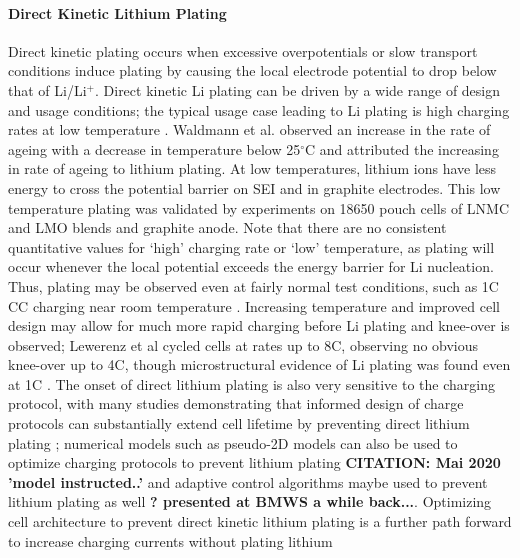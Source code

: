 \documentclass[journal=jpcl, manuscript=article, layout=onecolumn]{achemso}
\begin{document}
\paragraph{Direct Kinetic Lithium Plating}
Direct kinetic plating occurs when excessive overpotentials or slow transport conditions induce plating by causing the local electrode potential to drop below that of Li/Li$\mathrm{^+}$. Direct kinetic Li plating can be driven by a wide range of design and usage conditions; the typical usage case leading to Li plating is high charging rates at low temperature \cite{waldmann_temperature_2014, petzl_lithium_2015}. Waldmann et al.\cite{waldmann_temperature_2014} observed an increase in the rate of ageing with a decrease in temperature below 25$^{\circ}$C and attributed the increasing in rate of ageing to lithium plating. At low temperatures, lithium ions have less energy to cross the potential barrier on SEI and in graphite electrodes. This low temperature plating was validated by experiments on 18650 pouch cells of LNMC and LMO blends and graphite anode. Note that there are no consistent quantitative values for ‘high’ charging rate or ‘low’ temperature, as plating will occur whenever the local potential exceeds the energy barrier for Li nucleation. Thus, plating may be observed even at fairly normal test conditions, such as 1C CC charging near room temperature \cite{waldmann_optimization_2015,burns_-situ_2015}. Increasing temperature and improved cell design may allow for much more rapid charging before Li plating and knee-over is observed; Lewerenz et al cycled cells at rates up to 8C, observing no obvious knee-over up to 4C, though microstructural evidence of Li plating was found even at 1C \cite{lewerenz_systematic_2017}. The onset of direct lithium plating is also very sensitive to the charging protocol, with many studies demonstrating that informed design of charge protocols can substantially extend cell lifetime by preventing direct lithium plating \cite{waldmann_optimization_2015,schindler_fast_2018}; numerical models such as pseudo-2D models can also be used to optimize charging protocols to prevent lithium plating \textbf{CITATION: Mai 2020 'model instructed..'} and adaptive control algorithms maybe used to prevent lithium plating as well \textbf{? presented at BMWS a while back...}. Optimizing cell architecture to prevent direct kinetic lithium plating is a further path forward to increase charging currents without plating lithium \cite{usseglio-viretta_enabling_2020}
\end{document}
